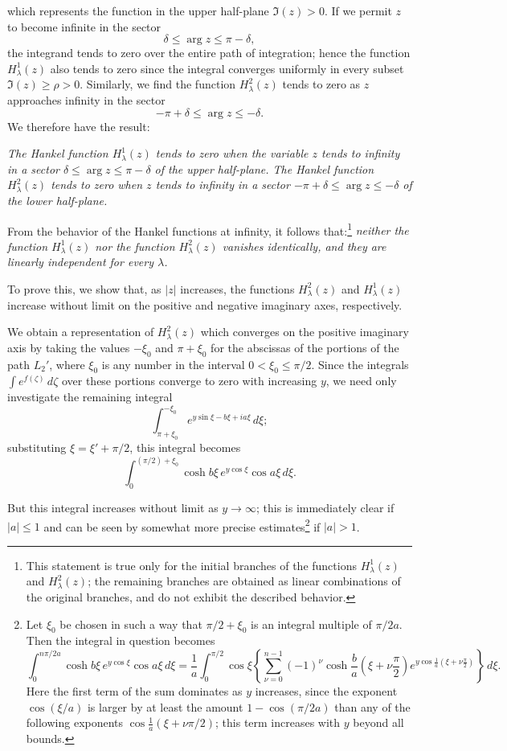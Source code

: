 which represents the function in the upper half-plane $\Im(z)>0$.
If we permit $z$ to become infinite in the sector
\[
\delta\le \arg z\le \pi-\delta,
\]
the integrand tends to zero over the entire path of integration; hence the function $H_\lambda^1(z)$ also tends to zero since the integral converges uniformly in every subset $\Im(z)\ge \rho>0$. Similarly, we find the function $H_\lambda^2(z)$ tends to zero as $z$ approaches infinity in the sector
\[
-\pi+\delta\le \arg z\le -\delta.
\]
We therefore have the result:

\emph{The Hankel function $H_\lambda^1(z)$ tends to zero when the variable $z$ tends to infinity in a sector $\delta\le \arg z\le \pi-\delta$ of the upper half-plane. The Hankel function $H_\lambda^2(z)$ tends to zero when $z$ tends to infinity in a sector $-\pi+\delta\le \arg z\le -\delta$ of the lower half-plane.}

From the behavior of the Hankel functions at infinity, it follows that:\footnote{This statement is true only for the initial branches of the functions $H_\lambda^1(z)$ and $H_\lambda^2(z)$; the remaining branches are obtained as linear combinations of the original branches, and do not exhibit the described behavior.}
\emph{neither the function $H_\lambda^1(z)$ nor the function $H_\lambda^2(z)$ vanishes identically, and they are linearly independent for every $\lambda$.}

To prove this, we show that, as $|z|$ increases, the functions $H_\lambda^2(z)$ and $H_\lambda^1(z)$ increase without limit on the positive and negative imaginary axes, respectively.

We obtain a representation of $H_\lambda^2(z)$ which converges on the positive imaginary axis by taking the values $-\xi_0$ and $\pi+\xi_0$ for the abscissas of the portions of the path $L_2'$, where $\xi_0$ is any number in the interval $0<\xi_0\le \pi/2$. Since the integrals $\int e^{f(\zeta)}\,d\zeta$ over these portions converge to zero with increasing $y$, we need only investigate the remaining integral
\[
\int_{\pi+\xi_0}^{-\xi_0}e^{y\sin\xi-b\xi+ia\xi}\,d\xi;
\]
substituting $\xi=\xi'+\pi/2$, this integral becomes
\[
\int_0^{(\pi/2)+\xi_0}\cosh b\xi\,e^{y\cos\xi}\cos a\xi\,d\xi.
\]

But this integral increases without limit as $y\to\infty$; this is immediately clear if $|a|\le1$ and can be seen by somewhat more precise estimates\footnote{Let $\xi_0$ be chosen in such a way that $\pi/2+\xi_0$ is an integral multiple of $\pi/2a$. Then the integral in question becomes
\[
\int_0^{n\pi/2a}\cosh b\xi\,e^{y\cos\xi}\cos a\xi\,d\xi
=\frac1a\int_0^{\pi/2}\cos\xi\left\{\sum_{\nu=0}^{n-1}(-1)^\nu\cosh\frac ba\left(\xi+\nu\frac\pi2\right)e^{y\cos\frac1a\left(\xi+\nu\frac\pi2\right)}\right\}\,d\xi.
\]
Here the first term of the sum dominates as $y$ increases, since the exponent $\cos(\xi/a)$ is larger by at least the amount $1-\cos(\pi/2a)$ than any of the following exponents $\cos\frac1a(\xi+\nu\pi/2)$; this term increases with $y$ beyond all bounds.} if $|a|>1$.

